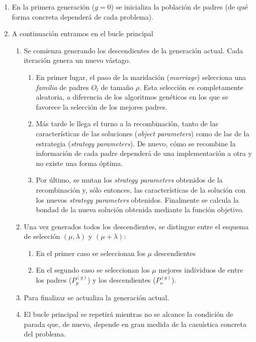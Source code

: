 \documentclass[12pt]{article} \usepackage[utf8]{inputenc}
\begin{document}
\begin{enumerate}
\item En la primera generación ($g = 0$) se inicializa la población de padres (de qué forma concreta dependerá de cada problema).
\item A continuación entramos en el bucle principal
  \begin{enumerate}
  \item Se comienza generando los descendientes de la generación actual. Cada iteración genera un nuevo vástago.
    \begin{enumerate}
    \item En primer lugar, el paso de la maridación (\textit{marriage}) selecciona una \textit{familia} de padres $O_l$ de tamaño $\rho$. Esta selección es completamente aleatoria, a diferencia de los algoritmos genéticos en los que se favorece la selección de los mejores padres.
    \item Más tarde le llega el turno a la recombinación, tanto de las características de las soluciones (\textit{object parameters}) como de las de la estrategia (\textit{strategy parameters}). De nuevo, cómo se recombine la información de cada padre dependerá de una implementación a otra y no existe una forma óptima.
    \item Por último, se mutan los \textit{strategy parameters} obtenidos de la recombinación y, sólo entonces, las características de la solución con los nuevos \textit{strategy parameters} obtenidos. Finalmente se calcula la bondad de la nueva solución obtenida mediante la función objetivo.
    \end{enumerate}
  \item Una vez generados todos los descendientes, se distingue entre el esquema de  selección $(\mu, \lambda)$ y $(\mu + \lambda)$:
    \begin{enumerate}
    \item En el primer caso se seleccionan los $\mu$ descendientes
    \item En el segundo caso se seleccionan los $\mu$ mejores individuos de entre los padres ($P_p^{(g)}$) y los descendientes ($P_o^{(g)}$).
    \end{enumerate}
  \item Para finalizar se actualiza la generación actual.
  \item El bucle principal se repetirá mientras no se alcance la condición de parada que, de nuevo, depende en gran medida de la casuística concreta del problema.
  \end{enumerate}
\end{enumerate}
\end{document}
